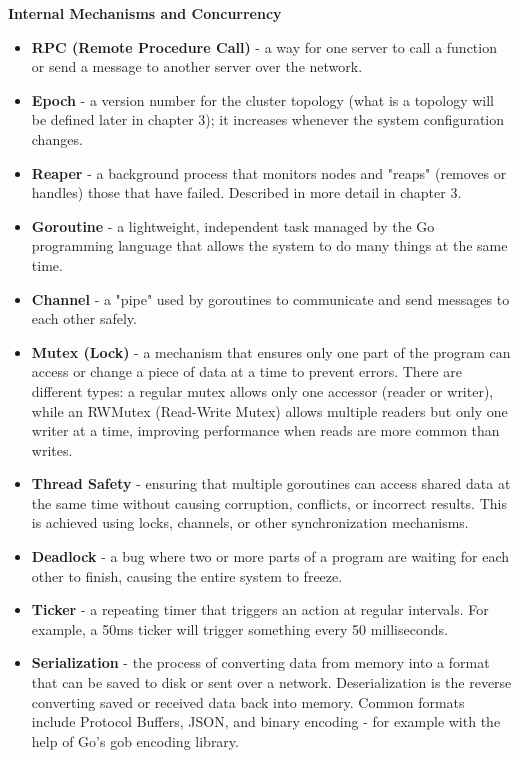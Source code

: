 \documentclass[shortabstract]{iithesis}
\begin{document}
\textbf{Internal Mechanisms and Concurrency}
\begin{itemize}
    \item \textbf{RPC (Remote Procedure Call)} \label{def:rpc} - a way for one server to call a function or send a message to another server over the network.
    \item \textbf{Epoch} \label{def:epoch} - a version number for the cluster topology (what is a topology will be defined later in chapter 3); it increases whenever the system configuration changes.
    \item \textbf{Reaper} \label{def:reaper} - a background process that monitors nodes and "reaps" (removes or handles) those that have failed. Described in more detail in chapter 3.
    \item \textbf{Goroutine} \label{def:goroutine} - a lightweight, independent task managed by the Go programming language that allows the system to do many things at the same time.
    \item \textbf{Channel} \label{def:channel} - a "pipe" used by goroutines to communicate and send messages to each other safely.
    \item \textbf{Mutex (Lock)} \label{def:mutex} - a mechanism that ensures only one part of the program can access or change a piece of data at a time to prevent errors. There are different types: a regular mutex allows only one accessor (reader or writer), while an RWMutex (Read-Write Mutex) allows multiple readers but only one writer at a time, improving performance when reads are more common than writes.
    \item \textbf{Thread Safety} \label{def:threadsafety} - ensuring that multiple goroutines can access shared data at the same time without causing corruption, conflicts, or incorrect results. This is achieved using locks, channels, or other synchronization mechanisms.
    \item \textbf{Deadlock} \label{def:deadlock} - a bug where two or more parts of a program are waiting for each other to finish, causing the entire system to freeze.
    \item \textbf{Ticker} \label{def:ticker} - a repeating timer that triggers an action at regular intervals. For example, a 50ms ticker will trigger something every 50 milliseconds.
    \item \textbf{Serialization} \label{def:serialization} - the process of converting data from memory into a format that can be saved to disk or sent over a network. Deserialization is the reverse converting saved or received data back into memory. Common formats include Protocol Buffers, JSON, and binary encoding - for example with the help of Go's gob encoding library.

\end{itemize}
\end{document}
